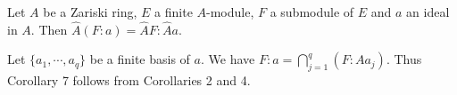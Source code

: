 Let $A$ be a Zariski ring, $E$ a finite $A$-module, $F$ a submodule of $E$ and $a$ an ideal in $A$. Then $\hat{A}(F:a) = \hat{A}F:\hat{A}a$.

Let $\{a_1, \cdots, a_q\}$ be a finite basis of $a$. We have $F:a = \bigcap_{j=1}^{q}(F:Aa_j)$. Thus Corollary 7 follows from Corollaries 2 and 4.